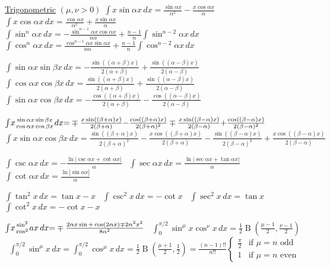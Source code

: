 {\underline{Trigonometric} \scriptsize{$(\mu,\nu>0)$}
$\int\!x\sin\alpha x\,dx{=}\frac{\sin\alpha x}{\alpha^2}{-}\frac{x\cos\alpha x}{\alpha}$ \
$\int\!x\cos\alpha x\,dx{=}\frac{\cos\alpha x}{\alpha^2}{+}\frac{x\sin\alpha x}{\alpha}$ \
$\int\!\sin^n\alpha x\,dx{=}{-}\frac{\sin^{n-1}\alpha x\cos\alpha x}{n\alpha}{+}\frac{n-1}{n}\int\!\sin^{n-2}\alpha x\,dx$ \
$\int\!\cos^n\alpha x\,dx{=}\frac{\cos^{n-1}\alpha x\sin\alpha x}{n\alpha}{+}\frac{n-1}{n}\int\!\cos^{n-2}\alpha x\,dx$

$\int\!\sin\alpha x\sin\beta x\,dx{=}{-}\frac{\sin((\alpha{+}\beta)x)}{2(\alpha{+}\beta)}{+}\frac{\sin((\alpha{-}\beta)x)}{2(\alpha{-}\beta)}$ \
$\int\!\cos\alpha x\cos\beta x\,dx{=}\frac{\sin((\alpha{+}\beta)x)}{2(\alpha{+}\beta)}{+}\frac{\sin((\alpha{-}\beta)x)}{2(\alpha{-}\beta)}$ \
$\int\!\sin\alpha x\cos\beta x\,dx{=}{-}\frac{\cos((\alpha{+}\beta)x)}{2(\alpha{+}\beta)}{-}\frac{\cos((\alpha{-}\beta)x)}{2(\alpha{-}\beta)}$

$\int\!x\genfrac{}{}{0pt}{}{\sin\alpha x\sin\beta x}{\cos\alpha x\cos\beta x}dx{=}\mp\frac{x\sin((\beta{+}\alpha)x)}{2(\beta{+}\alpha)}{-}\frac{\cos((\beta{+}\alpha)x)}{2(\beta{+}\alpha)^2}\mp\frac{x\sin((\beta{-}\alpha)x)}{2(\beta{-}\alpha)}{+}\frac{\cos((\beta{-}\alpha)x)}{2(\beta{-}\alpha)^2}$ \
$\int\!x\sin\alpha x\cos\beta x\,dx{=}\frac{\sin((\beta{+}\alpha)x)}{2(\beta{+}\alpha)^2}{-}\frac{x\cos((\beta{+}\alpha)x)}{2(\beta{+}\alpha)}{-}\frac{\sin((\beta{-}\alpha)x)}{2(\beta{-}\alpha)^2}{+}\frac{x\cos((\beta{-}\alpha)x)}{2(\beta{-}\alpha)}$

$\int\!\csc\alpha x\,dx{=}{-}\frac{\ln|\csc\alpha x{+}\cot\alpha x|}{\alpha}$ \
$\int\!\sec\alpha x\,dx{=}\frac{\ln|\sec\alpha x{+}\tan\alpha x|}{\alpha}$ \
$\int\!\cot\alpha x\,dx{=}\frac{\ln|\sin\alpha x|}{\alpha}$

$\int\!\tan^2x\,dx{=}\tan x{-}x$ \
$\int\!\csc^2x\,dx{=}{-}\cot x$ \
$\int\!\sec^2x\,dx{=}\tan x$ \
$\int\!\cot^2x\,dx{=}{-}\cot x{-}x$

$\int\!x\genfrac{}{}{0pt}{}{\sin^2}{\cos^2}ax\,dx{=}\mp\frac{2\alpha x\sin{+}\cos(2\alpha x)\mp2\alpha^2x^2}{8\alpha^2}$ \
$\int_0^{\pi/2}\!\sin^\mu x\cos^\nu x\,dx{=}\frac{1}{2}\operatorname{B}(\frac{\mu-1}{2},\frac{\nu-1}{2})$ \
$\int_0^{\pi/2}\!\sin^\mu x\,dx{=}\int_0^{\pi/2}\!\cos^\mu x\,dx{=}\frac{1}{2}\operatorname{B}(\frac{\mu+1}{2},\frac{1}{2}){=}\frac{(n-1)!!}{n!!}\begin{cases}\frac{\pi}{2}&\text{if }\mu{=}n\text{ odd}\\1&\text{if }\mu{=}n\text{ even}\end{cases}$

}
